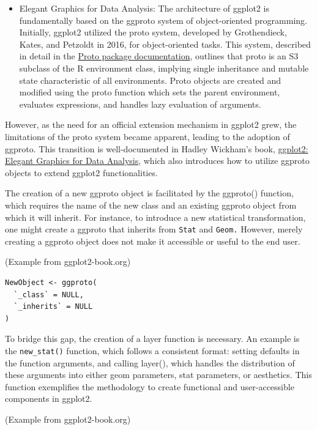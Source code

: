 \begin{itemize}
\tightlist
\item
  Elegant Graphics for Data Analysis: The architecture of ggplot2 is fundamentally based on the ggproto system of object-oriented programming. Initially, ggplot2 utilized the proto system, developed by Grothendieck, Kates, and Petzoldt in 2016, for object-oriented tasks. This system, described in detail in the \href{https://cran.r-project.org/web/packages/proto/proto.pdf}{Proto package documentation},
  outlines that proto is an S3 subclass of the R environment class, implying single inheritance and mutable state characteristic of all environments. Proto objects are created and modified using the proto function which sets the parent environment, evaluates expressions, and handles lazy evaluation of arguments.
\end{itemize}

However, as the need for an official extension mechanism in ggplot2 grew, the limitations of the proto system became apparent, leading to the adoption of ggproto. This transition is well-documented in Hadley Wickham's book, \href{https://ggplot2-book.org/}{ggplot2: Elegant Graphics for Data Analysis}, which also introduces how to utilize ggproto objects to extend ggplot2 functionalities.

The creation of a new ggproto object is facilitated by the ggproto() function, which requires the name of the new class and an existing ggproto object from which it will inherit. For instance, to introduce a new statistical transformation, one might create a ggproto that inherits from \texttt{Stat} and \texttt{Geom.} However, merely creating a ggproto object does not make it accessible or useful to the end user.

(Example from ggplot2-book.org)

\begin{verbatim}
NewObject <- ggproto(
  `_class` = NULL, 
  `_inherits` = NULL
)
\end{verbatim}

To bridge this gap, the creation of a layer function is necessary. An example is the \texttt{new\_stat()} function, which follows a consistent format: setting defaults in the function arguments, and calling layer(), which handles the distribution of these arguments into either geom parameters, stat parameters, or aesthetics. This function exemplifies the methodology to create functional and user-accessible components in ggplot2.

(Example from ggplot2-book.org)

